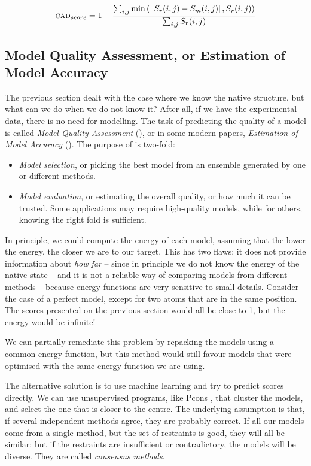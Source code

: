 \begin{equation*}
\textsc{cad}_{score} = 1 - \frac{\sum_{i,j} \min\left( \left| \: S_{r}(i, j) - S_{m}(i, j)\right|, S_{r}(i, j)\right)}{\sum_{i,j} S_{r}(i, j)}
\end{equation*}

\subsection[Model Quality Assessment]{Model Quality Assessment, or Estimation of Model Accuracy}
The previous section dealt with the case where we know the native structure, but what can we do when we do not know it?
After all, if we have the experimental data, there is no need for modelling.
The task of predicting the quality of a model is called \emph{Model Quality Assessment} (\MQA), or in some modern papers, \emph{Estimation of Model Accuracy} (\EMA).
The purpose of \MQA{} is two-fold:

\begin{itemize}
\item \emph{Model selection}, or picking the best model from an ensemble generated by one or different methods.
\item \emph{Model evaluation}, or estimating the overall quality, or how much it can be trusted.
Some applications may require high-quality models, while for others, knowing the right fold is sufficient.
\end{itemize}

In principle, we could compute the energy of each model, assuming that the lower the energy, the closer we are to our target.   
This has two flaws: it does not provide information about \emph{how far} -- since in principle we do not know the energy of the native state -- and it is not a reliable way of comparing models from different methods -- because energy functions are very sensitive to small details.
Consider the case of a perfect model, except for two atoms that are in the same position.
The scores presented on the previous section would all be close to 1, but the energy would be infinite!

We can partially remediate this problem by repacking the models using a common energy function, but this method would still favour models that were optimised with the same energy function we are using.


The alternative solution is to use machine learning and try to predict scores directly.
We can use unsupervised programs, like Pcons \citep{pcons}, that cluster the models, and select the one that is closer to the centre.
The underlying assumption is that, if several independent methods agree, they are probably correct.
If all our models come from a single method, but the set of restraints is good, they will all be similar; but if the restraints are insufficient or contradictory, the models will be diverse.
They are called \emph{consensus methods}.

